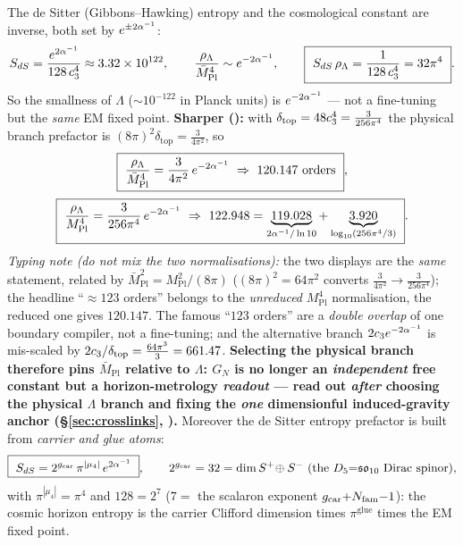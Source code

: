 \begin{keybox}
The de Sitter (Gibbons--Hawking) entropy and the cosmological constant are inverse, both set by
$e^{\pm2\alpha^{-1}}$:
\[
  S_{dS}=\frac{e^{2\ainv}}{128\,\cthree^4}\approx3.32\times10^{122},\qquad
  \frac{\rho_\Lambda}{\bar M_{\mathrm{Pl}}^4}\sim e^{-2\ainv},\qquad
  \boxed{\ S_{dS}\,\rho_\Lambda=\frac{1}{128\,\cthree^4}=32\pi^4\ }.
\]
So the smallness of $\Lambda$ ($\sim10^{-122}$ in Planck units) is $e^{-2\alpha^{-1}}$ --- not a fine-tuning but
the \emph{same} EM fixed point. \textbf{Sharper ():} with
$\delta_{\mathrm{top}}=48c_3^4=\tfrac{3}{256\pi^4}$ the physical branch prefactor is
$(8\pi)^2\delta_{\mathrm{top}}=\tfrac{3}{4\pi^2}$, so
\begin{gather*}
  \boxed{\ \frac{\rho_\Lambda}{\bar M_{\mathrm{Pl}}^4}=\frac{3}{4\pi^2}\,e^{-2\ainv}\ \Rightarrow\ 120.147\ \text{orders}\ },\\[2pt]
  \boxed{\ \frac{\rho_\Lambda}{M_{\mathrm{Pl}}^4}=\frac{3}{256\pi^4}\,e^{-2\ainv}\ \Rightarrow\
  122.948=\underbrace{119.028}_{2\ainv/\ln10}+\underbrace{3.920}_{\log_{10}(256\pi^4/3)}\ }.
\end{gather*}
\emph{Typing note (do not mix the two normalisations):} the two displays are the \emph{same} statement,
related by $\bar M_{\mathrm{Pl}}^2=M_{\mathrm{Pl}}^2/(8\pi)$ ($(8\pi)^2=64\pi^2$ converts
$\tfrac3{4\pi^2}\to\tfrac3{256\pi^4}$); the headline ``$\approx123$ orders'' belongs to the
\emph{unreduced} $M_{\mathrm{Pl}}^4$ normalisation, the reduced one gives $120.147$.
The famous ``$123$ orders'' are a \emph{double overlap} of one boundary compiler, not a fine-tuning; and the
alternative branch $2c_3 e^{-2\alpha^{-1}}$ is mis-scaled by $2c_3/\delta_{\mathrm{top}}=\tfrac{64\pi^3}{3}=661.47$.
\textbf{Selecting the physical branch therefore pins $\bar M_{\mathrm{Pl}}$ relative to $\Lambda$: $G_N$ is no
longer an \emph{independent} free constant but a horizon-metrology \emph{readout} --- read out \emph{after}
choosing the physical $\Lambda$ branch and fixing the \emph{one} dimensionful induced-gravity anchor
(\S\ref{sec:crosslinks}, \veri{v68\_seeley\_dewitt\_residual.py}).} Moreover the de Sitter entropy prefactor is
built from \emph{carrier and glue atoms}:
\[
  \boxed{\ S_{dS}=2^{\gcar}\,\pi^{|\mu_4|}\,e^{2\ainv}\ },\qquad
  2^{\gcar}=32=\dim S^+\!\oplus S^-\ (\text{the }D_5{=}\mathfrak{so}_{10}\text{ Dirac spinor}),
\]
with $\pi^{|\mu_4|}=\pi^4$ and $128=2^7$ ($7=$ the scalaron exponent $g_{\mathrm{car}}{+}N_{\mathrm{fam}}{-}1$): the cosmic
horizon entropy is the carrier Clifford dimension times $\pi^{\text{glue}}$ times the EM fixed point.
\end{keybox}

